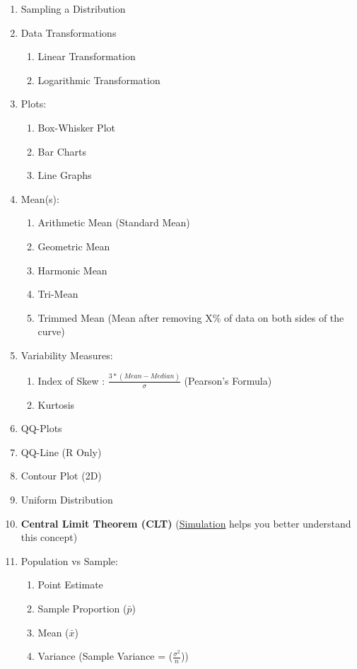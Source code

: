 \documentclass[11pt]{article}
\begin{document}
\begin{enumerate}
\begin{enumerate}
\end{enumerate}
\item Sampling a Distribution
\item Data Transformations
\begin{enumerate}
	\item Linear Transformation
	\item Logarithmic Transformation
\end{enumerate}
\item Plots:
\begin{enumerate}
	\item Box-Whisker Plot
	\item Bar Charts
	\item Line Graphs
\end{enumerate}
\item Mean(s):
\begin{enumerate}
	\item Arithmetic Mean (Standard Mean)
	\item Geometric Mean
	\item Harmonic Mean
	\item Tri-Mean
	\item Trimmed Mean (Mean after removing X\%  of data on both sides of the curve)
\end{enumerate}
\item Variability Measures:
\begin{enumerate}
	\item Index of Skew :  $ \frac{3 * ( Mean - Median )}{ \sigma }$ (Pearson's Formula)
	\item Kurtosis
\end{enumerate}
\item QQ-Plots
\item QQ-Line (R Only)
\item Contour Plot (2D)
\item Uniform Distribution
\item \textbf{Central Limit Theorem (CLT)} (\href{http://onlinestatbook.com/2/sampling_distributions/clt_demo.html}{Simulation} helps you better understand this concept)
\item Population vs Sample:
\begin{enumerate}
	\item Point Estimate
	\item Sample Proportion ($\bar{p}$)
	\item Mean ($\bar{x}$)
	\item Variance (Sample Variance = ($ \frac{\sigma^2}{n} $))

\end{enumerate}
\end{enumerate}
\end{document}
